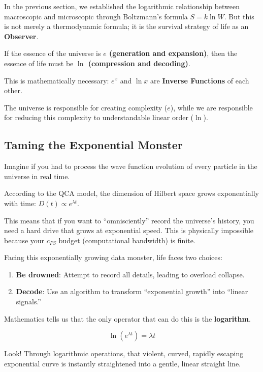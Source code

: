 \documentclass[11pt,a4paper,twoside]{book}
\begin{document}
In the previous section, we established the logarithmic relationship between macroscopic and microscopic through Boltzmann's formula $S = k \ln W$. But this is not merely a thermodynamic formula; it is the survival strategy of life as an \textbf{Observer}.

If the essence of the universe is \textbf{$e$ (generation and expansion)}, then the essence of life must be \textbf{$\ln$ (compression and decoding)}.

This is mathematically necessary: $e^x$ and $\ln x$ are \textbf{Inverse Functions} of each other.

The universe is responsible for creating complexity ($e$), while we are responsible for reducing this complexity to understandable linear order ($\ln$).

\subsection{Taming the Exponential Monster}

Imagine if you had to process the wave function evolution of every particle in the universe in real time.

According to the QCA model, the dimension of Hilbert space grows exponentially with time: $D(t) \propto e^{\lambda t}$.

This means that if you want to ``omnisciently'' record the universe's history, you need a hard drive that grows at exponential speed. This is physically impossible because your $c_{FS}$ budget (computational bandwidth) is finite.

Facing this exponentially growing data monster, life faces two choices:

\begin{enumerate}
\item \textbf{Be drowned}: Attempt to record all details, leading to overload collapse.

\item \textbf{Decode}: Use an algorithm to transform ``exponential growth'' into ``linear signals.''
\end{enumerate}

Mathematics tells us that the only operator that can do this is the \textbf{logarithm}.

$$\ln(e^{\lambda t}) = \lambda t$$

Look! Through logarithmic operations, that violent, curved, rapidly escaping exponential curve is instantly straightened into a gentle, linear straight line.
\end{document}
